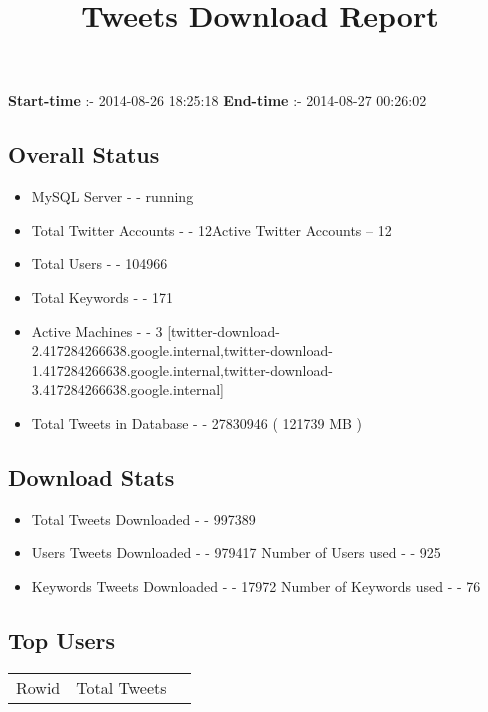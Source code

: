 \documentclass{article}\usepackage[T1]{fontenc}
\begin{document}
\title{\textbf{Tweets Download Report}}
               \date{}
                \maketitle
               \centerline{\textbf{Start-time} :- 2014-08-26 18:25:18 \hspace{40pt} \textbf{End-time} :- 2014-08-27 00:26:02}               \subsection*{Overall Status}                \begin{itemize}                \item MySQL Server - - running               \item Total Twitter Accounts - - 12\newline Active Twitter Accounts -- 12               \item Total Users - - 104966               \item Total Keywords - - 171               \item Active Machines - - 3 [twitter-download-2.417284266638.google.internal,twitter-download-1.417284266638.google.internal,twitter-download-3.417284266638.google.internal]               \item Total Tweets in Database - - 27830946 ( 121739 MB )               \end{itemize}               \subsection*{Download Stats}                \begin{itemize}                \item Total Tweets Downloaded - - 997389               \item Users Tweets Downloaded - - 979417 \newline Number of Users used - - 925               \item Keywords Tweets Downloaded - - 17972 \newline Number of Keywords used - - 76              \end{itemize}              \subsection*{Top Users}\begin{tabular}{|c|c|c|}         \hline         Rowid & Total Tweets \\ 

\end{tabular}
\end{document}
